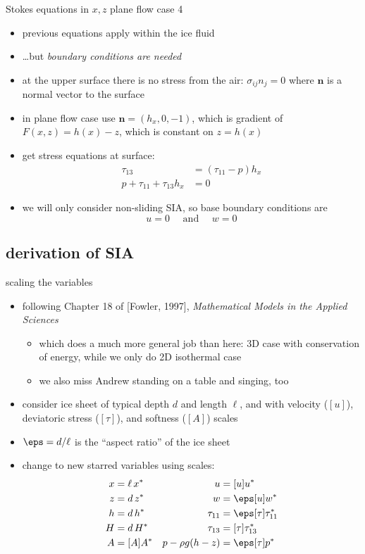 \begin{frame}{Stokes equations in $x,z$ plane flow case 4}

\begin{itemize}
\item previous equations apply within the ice fluid
\item \dots but \emph{boundary conditions are needed}
\item at the upper surface there is no stress from the air: $\sigma_{ij} n_j = 0$ where $\mathbf{n}$ is a normal vector to the surface
\item in plane flow case use $\mathbf{n} = (h_x,0,-1)$, which is gradient of $F(x,z)=h(x)-z$, which is constant on $z=h(x)$
\item get stress equations at surface:
\begin{align*}
\tau_{13} &= (\tau_{11} - p) h_x \\
p + \tau_{11} + \tau_{13} h_x &= 0
\end{align*}
\item we will only consider non-sliding SIA, so base boundary conditions are
   $$u=0 \quad \text{ and } \quad w=0$$
\end{itemize}
\end{frame}


\subsection{derivation of SIA}


\begin{frame}{scaling the variables}
\label{slide:siascalings}

\begin{itemize}
\item following Chapter 18 of [Fowler, 1997], \emph{Mathematical Models in the Applied Sciences}
  \begin{itemize}
    \scriptsize
    \item which does a much more general job than here: 3D case with conservation of energy, while we only do 2D isothermal case
    \item we also miss Andrew standing on a table and singing, too
    \normalsize
  \end{itemize}
\item consider ice sheet of typical depth $d$ and length $\ell$, and with velocity ($[u]$), deviatoric stress ($[\tau]$), and softness ($[A]$) scales
\item $\eps = d/\ell$ is the ``aspect ratio'' of the ice sheet
\item change to new starred variables using scales:\small
\begin{align*}
x &= \ell\, x^* &         u &= [u] u^* \\
z &= d\, z^*    &         w &= \eps [u] w^* \\
h &= d\, h^*    & \tau_{11} &= \eps [\tau] \tau_{11}^* \\
H &= d\, H^*    & \tau_{13} &= [\tau] \tau_{13}^* \\
A &= [A] A^*  & p - \rho g (h-z) &= \eps [\tau] p^*
\end{align*}
\normalsize
\end{itemize}
\end{frame}


